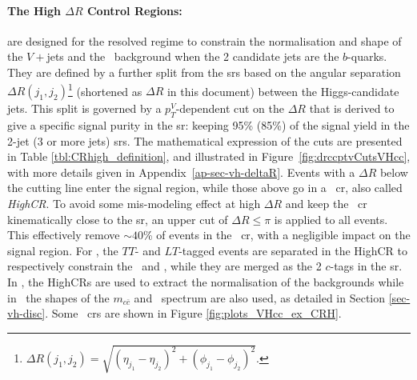 \paragraph{The High $\Delta R$ Control Regions:} are designed for the resolved regime to constrain the normalisation and shape of the $V+$jets and the \ttb\ background when the 2 candidate jets are the $b$-quarks. They are defined by a further split from the \gls{sr}s based on the angular separation $\Delta R(j_1, j_2)$\footnote{$\Delta R(j_1, j_2) = \sqrt{(\eta_{j_1} - \eta_{j_2})^2 + (\phi_{j_1} - \phi_{j_2})^2 }$.} (shortened as $\Delta R$ in this document) between the Higgs-candidate jets. This split is governed by a $p_T^V$-dependent cut on the $\Delta R$ that is derived to give a specific signal purity in the \gls{sr}: keeping 95\% (85\%) of the signal yield in the 2-jet (3 or more jets) \gls{sr}s. The mathematical expression of the cuts are presented in Table \ref{tbl:CRhigh_definition}, and illustrated in Figure~\ref{fig:drccptvCutsVHcc}, with more details given in Appendix~\ref{ap-sec-vh-deltaR}. Events with a $\Delta R$ below the cutting line enter the signal region, while those above go in a \highdr\ \gls{cr}, also called \textit{HighCR}. To avoid some mis-modeling effect at high $\Delta R$ and keep the \highdr\ \gls{cr} kinematically close to the \gls{sr}, an upper cut of $\Delta R \leq \pi$ is applied to all events. This effectively remove $\sim 40$\% of events in the \highdr\ \gls{cr}, with a negligible impact on the signal region. For \vhc, the $TT$- and $LT$-tagged events are separated in the HighCR to respectively constrain the \vhf\ and \vmf, while they are merged as the 2 $c$-tags in the \gls{sr}. In \vhb, the HighCRs are used to extract the normalisation of the backgrounds while in \vhc\ the shapes of the $m_{c\bar{c}}$ and \ptv\ spectrum are also used, as detailed in Section \ref{sec-vh-disc}. Some \highdr\ \gls{cr}s are shown in Figure \ref{fig:plots_VHcc_ex_CRH}.

